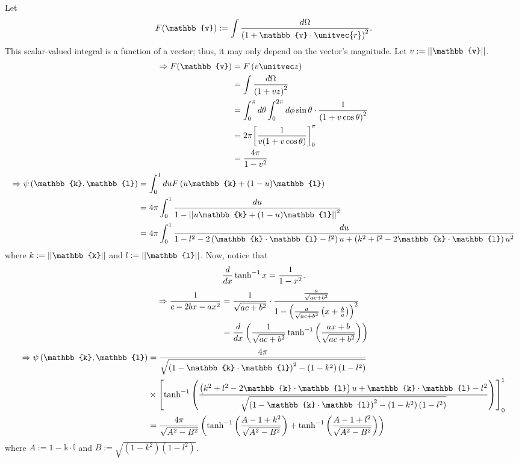 Let
\[
    F(\mathbb{v}) := \int \frac{d\Omega}{{\left( 1 + \mathbb{v} \cdot \unitvec{r} \right)}^2}.
\]
This scalar-valued integral is a function of a vector;
thus, it may only depend on the vector's magnitude.
Let $v := \norm{\mathbb{v}}$.
\begin{align*}
    \Rightarrow F(\mathbb{v})
    &= F \left( v \zhat \right) \\
    &= \int \frac{d\Omega}{{\left( 1 + vz \right)}^2} \\
    &= \int_0^\pi d\theta \int_0^{2\pi} d\phi \sin \theta \cdot \inv{{\left( 1 + v\cos \theta \right)}^2} \\
    &= 2\pi \diffBetween{\inv{v(1 + v \cos \theta)}}{0}{\pi} \\
    &= \frac{4\pi}{1 - v^2}
\end{align*}
\begin{align*}
    \Rightarrow \psi \left(\mathbb{k}, \mathbb{l} \right)
    &= \int_0^1 du F\left( u\mathbb{k} + (1 - u)\mathbb{l} \right) \\
    &= 4\pi \int_0^1 \frac{du}{1 - \norm{u\mathbb{k} + (1 - u)\mathbb{l}}^2} \\
    &= 4\pi \int_0^1 \frac{du}{
        1 - l^2
        - 2\left( \mathbb{k}\cdot\mathbb{l} - l^2 \right) u
        + \left( k^2 + l^2 - 2\mathbb{k}\cdot\mathbb{l} \right) u^2
    }
\end{align*}
where $k := \norm{\mathbb{k}}$ and $l := \norm{\mathbb{l}}$.
Now, notice that
\[
    \frac{d}{dx} \tanh^{-1} x = \frac{1}{1 - x^2}.
\]
\begin{align*}
    \Rightarrow \frac{1}{c - 2bx - ax^2}
    &=  \frac{1}{\sqrt{ac + b^2}} \cdot \frac{\frac{a}{\sqrt{ac + b^2}}}{1 - {\left(
        \frac{a}{\sqrt{ac + b^2}} \left( x + \frac{b}{a} \right)
    \right)}^2} \\
    &= \frac{d}{dx} \left( \frac{1}{\sqrt{ac + b^2}} \tanh^{-1} \left( \frac{ax + b}{\sqrt{ac + b^2}} \right) \right)
\end{align*}
\begin{align*}
    \Rightarrow \psi \left(\mathbb{k}, \mathbb{l} \right)
    &= \frac{4\pi}{\sqrt{
        {\left( 1 - \mathbb{k}\cdot\mathbb{l} \right)}^2
        - \left( 1 - k^2 \right) \left( 1 - l^2 \right)
    }} \\
    &\times \diffBetween{\tanh^{-1} \left(
        \frac{
            \left( k^2 + l^2 - 2\mathbb{k}\cdot\mathbb{l} \right) u 
            + \mathbb{k}\cdot\mathbb{l} - l^2
        }{\sqrt{
             {\left( 1 - \mathbb{k}\cdot\mathbb{l} \right)}^2
            - \left( 1 - k^2 \right) \left( 1 - l^2 \right)
        }}
    \right)}{0}{1} \\
    &= \frac{4\pi}{\sqrt{A^2 - B^2}} \left(
        \tanh^{-1} \left( \frac{A - 1 + k^2}{\sqrt{A^2 - B^2}} \right)
        + \tanh^{-1} \left( \frac{A - 1 + l^2}{\sqrt{A^2 - B^2}} \right)
    \right)
\end{align*}
where $A := 1 - \mathbb{k}\cdot\mathbb{l}$ and $B := \sqrt{\left( 1 - k^2 \right) \left( 1 - l^2 \right)}$.

